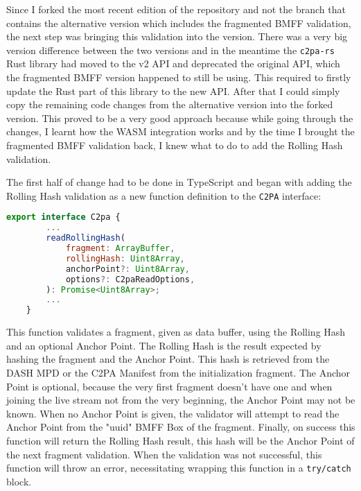 Since I forked the most recent edition of the repository and not the branch that contains the alternative version which includes the fragmented BMFF validation, the next step was bringing this validation into the version. There was a very big version difference between the two versions and in the meantime the \texttt{c2pa-rs} Rust library had moved to the v2 API and deprecated the original API, which the fragmented BMFF version happened to still be using. This required to firstly update the Rust part of this library to the new API. After that I could simply copy the remaining code changes from the alternative version into the forked version. This proved to be a very good approach because while going through the changes, I learnt how the WASM integration works and by the time I brought the fragmented BMFF validation back, I knew what to do to add the Rolling Hash validation.

The first half of change had to be done in TypeScript and began with adding the Rolling Hash validation as a new function definition to the \texttt{C2PA} interface:

\begin{minipage}{\linewidth}
\begin{lstlisting}[caption={New Rolling Hash Validation Function}, label=code:rh_validate, language=JavaScript, captionpos=b]
    export interface C2pa {
        ...
        readRollingHash(
            fragment: ArrayBuffer,
            rollingHash: Uint8Array,
            anchorPoint?: Uint8Array,
            options?: C2paReadOptions,
        ): Promise<Uint8Array>;
        ...
    }
\end{lstlisting}
\end{minipage}

This function validates a fragment, given as data buffer, using the Rolling Hash and an optional Anchor Point. The Rolling Hash is the result expected by hashing the fragment and the Anchor Point. This hash is retrieved from the DASH MPD or the C2PA Manifest from the initialization fragment. The Anchor Point is optional, because the very first fragment doesn't have one and when joining the live stream not from the very beginning, the Anchor Point may not be known. When no Anchor Point is given, the validator will attempt to read the Anchor Point from the "uuid" BMFF Box of the fragment. Finally, on success this function will return the Rolling Hash result, this hash will be the Anchor Point of the next fragment validation. When the validation was not successful, this function will throw an error, necessitating wrapping this function in a \texttt{try/catch} block.


